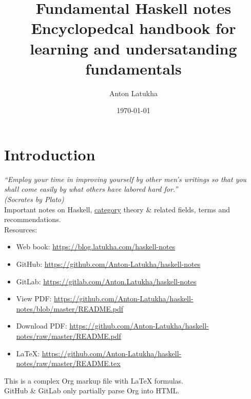 \documentclass[a4paper,14pt,oneside]{book}
\author{Anton Latukha}
\date{\today}
\title{Fundamental Haskell notes\\\medskip
\large Encyclopedcal handbook for learning and undersatanding fundamentals}
\begin{document}
\maketitle
\setcounter{tocdepth}{10}
\tableofcontents

\setcounter{tocdepth}{10}
\tableofcontents

\part{Introduction}
\label{sec:orgf6026f5}

\emph{“Employ your time in improving yourself by other men's writings so that you shall come easily by what others have labored hard for.”\\
(Socrates by Plato)}\\

Important notes on Haskell, \hyperref[org64eee11]{category} theory \& related fields, terms and recommendations.\\

Resources:\\
\begin{itemize}
\item Web book: \url{https://blog.latukha.com/haskell-notes}\\
\item GitHub: \url{https://github.com/Anton-Latukha/haskell-notes}\\
\item GitLab: \url{https://gitlab.com/Anton.Latukha/haskell-notes}\\
\item View PDF: \url{https://github.com/Anton-Latukha/haskell-notes/blob/master/README.pdf}\\
\item Download PDF: \url{https://github.com/Anton-Latukha/haskell-notes/raw/master/README.pdf}\\
\item \LaTeX{}: \url{https://github.com/Anton-Latukha/haskell-notes/raw/master/README.tex}\\
\end{itemize}

This is a complex Org markup file with \LaTeX{} formulas.\\
GitHub \& GitLab only partially parse Org into HTML.\\
\end{document}
